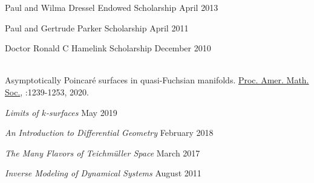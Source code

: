 \begin{singlespace}
	{Paul and Wilma Dressel Endowed Scholarship} \hfill{April 2013} \\
	\indent {}

	{Paul and Gertrude Parker Scholarship} \hfill {April 2011} \\
	\indent {}
	
	{Doctor Ronald C Hamelink Scholarship} \hfill {December 2010} \\
	\indent {} \\


\vfill

\vspace{5pt}
\hspace{-12pt}{\color{sectiontitles}{\large Publications}}
\vspace{10pt}



Asymptotically Poincar\'e surfaces in quasi-Fuchsian manifolds. \underline{Proc. Amer. Math. Soc.}, :1239-1253, 2020.

\vfill

\vspace{5pt}
\hspace{-12pt}{\color{sectiontitles}{\large Talks and Presentations}}
\vspace{10pt}

{\em Limits of $k$-surfaces} \hfill {May 2019} \\
\indent {}

{\em An Introduction to Differential Geometry} \hfill {February 2018} \\
\indent {}

{\em The Many Flavors of Teichm\"uller Space} \hfill {March 2017} \\
\indent {}

{\em Inverse Modeling of Dynamical Systems} \hfill {August 2011}\\
\indent {} \\

\vfill

\vspace{5pt}
\hspace{-12pt}{\color{sectiontitles}{\large Organization}}
\vspace{10pt}



\end{singlespace}

